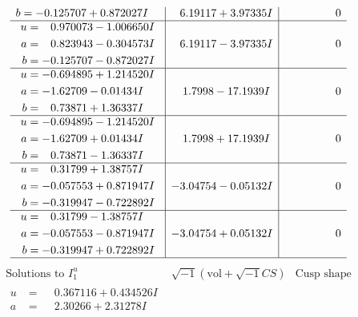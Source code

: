 \documentclass[1p]{elsarticle_modified}
\theoremstyle{definition}
\newcommand{\I}{\sqrt{-1}}
\begin{document}
$$\begin{array}{c|c|c}
\begin{aligned}
b &= -0.125707 + 0.872027 I\end{aligned}
 & \phantom{-}6.19117 + 3.97335 I & \phantom{-0.000000 } 0 \\ \hline\begin{aligned}
u &= \phantom{-}0.970073 - 1.006650 I \\
a &= \phantom{-}0.823943 - 0.304573 I \\
b &= -0.125707 - 0.872027 I\end{aligned}
 & \phantom{-}6.19117 - 3.97335 I & \phantom{-0.000000 } 0 \\ \hline\begin{aligned}
u &= -0.694895 + 1.214520 I \\
a &= -1.62709 - 0.01434 I \\
b &= \phantom{-}0.73871 + 1.36337 I\end{aligned}
 & \phantom{-}1.7998 - 17.1939 I & \phantom{-0.000000 } 0 \\ \hline\begin{aligned}
u &= -0.694895 - 1.214520 I \\
a &= -1.62709 + 0.01434 I \\
b &= \phantom{-}0.73871 - 1.36337 I\end{aligned}
 & \phantom{-}1.7998 + 17.1939 I & \phantom{-0.000000 } 0 \\ \hline\begin{aligned}
u &= \phantom{-}0.31799 + 1.38757 I \\
a &= -0.057553 + 0.871947 I \\
b &= -0.319947 - 0.722892 I\end{aligned}
 & -3.04754 - 0.05132 I & \phantom{-0.000000 } 0 \\ \hline\begin{aligned}
u &= \phantom{-}0.31799 - 1.38757 I \\
a &= -0.057553 - 0.871947 I \\
b &= -0.319947 + 0.722892 I\end{aligned}
 & -3.04754 + 0.05132 I & \phantom{-0.000000 } 0\\
 \hline 
 \end{array}$$\newpage$$\begin{array}{c|c|c}  
\text{Solutions to }I^u_{1}& \I (\text{vol} + \sqrt{-1}CS) & \text{Cusp shape}\\
 \hline 
\begin{aligned}
u &= \phantom{-}0.367116 + 0.434526 I \\
a &= \phantom{-}2.30266 + 2.31278 I \\

\end{aligned}
\end{array}$$
\end{document}
